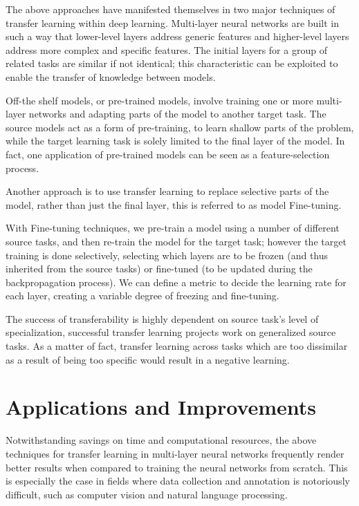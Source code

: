 The above approaches have manifested themselves in two major techniques of transfer learning within deep learning. Multi-layer neural networks are built in such a way that lower-level layers address generic features and higher-level layers address more complex and specific features. The initial layers for a group of related tasks are similar if not identical; this characteristic can be exploited to enable the transfer of knowledge between models. \citet{yosinski2014}

Off-the shelf models, or pre-trained models, involve training one or more multi-layer networks and adapting parts of the model to another target task. The source models act as a form of pre-training, to learn shallow parts of the problem, while the target learning task is solely limited to the final layer of the model. In fact, one application of pre-trained models can be seen as a feature-selection process. \citet{zhu2018}

Another approach is to use transfer learning to replace selective parts of the model, rather than just the final layer, this is referred to as model Fine-tuning. 

With Fine-tuning techniques, we pre-train a model using a number of different source tasks, and then re-train the model for the target task; however the target training is done selectively, selecting which layers are to be frozen (and thus inherited from the source tasks) or fine-tuned (to be updated during the backpropagation process). We can define a metric to decide the learning rate for each layer, creating a variable degree of freezing and fine-tuning. \citet{madhavan2016}

The success of transferability is highly dependent on source task’s level of specialization, successful transfer learning projects work on generalized source tasks. As a matter of fact, transfer learning across tasks which are too dissimilar as a result of being too specific would result in a negative learning.\citet{rosenstein2005}


\section{Applications and Improvements}\label{sec:transfer-learning-applications-improvements}

Notwithstanding savings on time and computational resources, the above techniques for transfer learning in multi-layer neural networks frequently render better results when compared to training the neural networks from scratch.\citet{yosinski2014} This is especially the case in fields where data collection and annotation is notoriously difficult, such as computer vision and natural language processing. 

